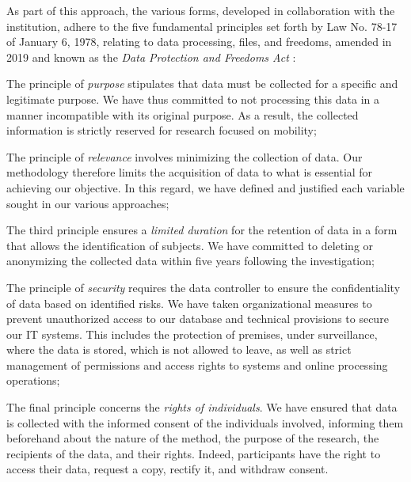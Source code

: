 \begin{refsegment}
As part of this approach, the various forms, developed in collaboration with the institution, adhere to the five fundamental principles set forth by Law No. 78-17 of January 6, 1978, relating to data processing, files, and freedoms, amended in 2019 and known as the \textsl{Data Protection and Freedoms Act} \textcolor{blue}{\autocite[16]{inshs_sciences_2021}}:
\begin{customitemize}
    \item The principle of \textsl{purpose} stipulates that data must be collected for a specific and legitimate purpose. We have thus committed to not processing this data in a manner incompatible with its original purpose. As a result, the collected information is strictly reserved for research focused on mobility;
    \item The principle of \textsl{relevance} involves minimizing the collection of data. Our methodology therefore limits the acquisition of data to what is essential for achieving our objective. In this regard, we have defined and justified each variable sought in our various approaches;
    \item The third principle ensures a \textsl{limited duration} for the retention of data in a form that allows the identification of subjects. We have committed to deleting or anonymizing the collected data within five years following the investigation;
    \item The principle of \textsl{security} requires the data controller to ensure the confidentiality of data based on identified risks. We have taken organizational measures to prevent unauthorized access to our database and technical provisions to secure our IT systems. This includes the protection of premises, under surveillance, where the data is stored, which is not allowed to leave, as well as strict management of permissions and access rights to systems and online processing operations;
    \item The final principle concerns the \textsl{rights of individuals}. We have ensured that data is collected with the informed consent of the individuals involved, informing them beforehand about the nature of the method, the purpose of the research, the recipients of the data, and their rights. Indeed, participants have the right to access their data, request a copy, rectify it, and withdraw consent.
\end{customitemize}%


\end{refsegment}
